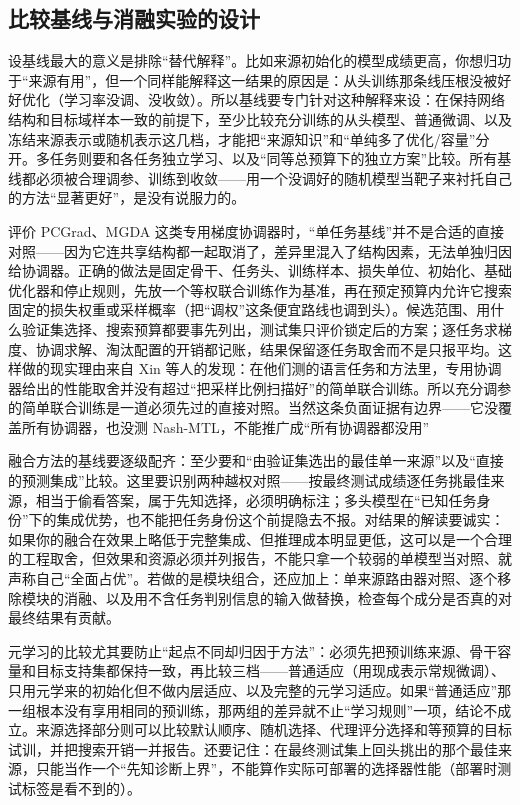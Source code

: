 \subsection{比较基线与消融实验的设计}
\label{sec:ket-evaluation-baselines}

设基线最大的意义是排除“替代解释”。比如来源初始化的模型成绩更高，你想归功于“来源有用”，但一个同样能解释这一结果的原因是：从头训练那条线压根没被好好优化（学习率没调、没收敛）。所以基线要专门针对这种解释来设：在保持网络结构和目标域样本一致的前提下，至少比较充分训练的从头模型、普通微调、以及冻结来源表示或随机表示这几档，才能把“来源知识”和“单纯多了优化/容量”分开。多任务则要和各任务独立学习、以及“同等总预算下的独立方案”比较。所有基线都必须被合理调参、训练到收敛——用一个没调好的随机模型当靶子来衬托自己的方法“显著更好”，是没有说服力的。

评价 PCGrad、MGDA 这类专用梯度协调器时，“单任务基线”并不是合适的直接对照——因为它连共享结构都一起取消了，差异里混入了结构因素，无法单独归因给协调器。正确的做法是固定骨干、任务头、训练样本、损失单位、初始化、基础优化器和停止规则，先放一个等权联合训练作为基准，再在预定预算内允许它搜索固定的损失权重或采样概率（把“调权”这条便宜路线也调到头）。候选范围、用什么验证集选择、搜索预算都要事先列出，测试集只评价锁定后的方案；逐任务求梯度、协调求解、淘汰配置的开销都记账，结果保留逐任务取舍而不是只报平均。这样做的现实理由来自 Xin 等人的发现：在他们测的语言任务和方法里，专用协调器给出的性能取舍并没有超过“把采样比例扫描好”的简单联合训练。所以充分调参的简单联合训练是一道必须先过的直接对照。当然这条负面证据有边界——它没覆盖所有协调器，也没测 Nash-MTL，不能推广成“所有协调器都没用”

融合方法的基线要逐级配齐：至少要和“由验证集选出的最佳单一来源”以及“直接的预测集成”比较。这里要识别两种越权对照——按最终测试成绩逐任务挑最佳来源，相当于偷看答案，属于先知选择，必须明确标注；多头模型在“已知任务身份”下的集成优势，也不能把任务身份这个前提隐去不报。对结果的解读要诚实：如果你的融合在效果上略低于完整集成、但推理成本明显更低，这可以是一个合理的工程取舍，但效果和资源必须并列报告，不能只拿一个较弱的单模型当对照、就声称自己“全面占优”。若做的是模块组合，还应加上：单来源路由器对照、逐个移除模块的消融、以及用不含任务判别信息的输入做替换，检查每个成分是否真的对最终结果有贡献。

元学习的比较尤其要防止“起点不同却归因于方法”：必须先把预训练来源、骨干容量和目标支持集都保持一致，再比较三档——普通适应（用现成表示常规微调）、只用元学来的初始化但不做内层适应、以及完整的元学习适应。如果“普通适应”那一组根本没有享用相同的预训练，那两组的差异就不止“学习规则”一项，结论不成立。来源选择部分则可以比较默认顺序、随机选择、代理评分选择和等预算的目标试训，并把搜索开销一并报告。还要记住：在最终测试集上回头挑出的那个最佳来源，只能当作一个“先知诊断上界”，不能算作实际可部署的选择器性能（部署时测试标签是看不到的）。

